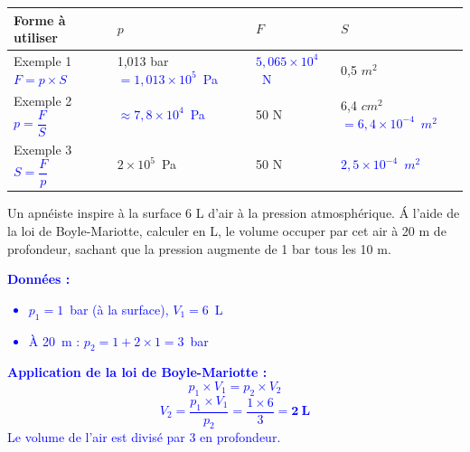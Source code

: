 \documentclass[11pt,a4paper]{article}
\renewcommand{\arraystretch}{2}
\newcommand{\correction}[1]{\textcolor{blue}{#1}}
\begin{document}
\begin{fleche}
\begin{center}
    \renewcommand{\arraystretch}{3}
    \begin{tabular}{|p{6cm}|C{2cm}|C{2cm}|C{2cm}|}
         \hline
      Forme à utiliser & $p$ & $F$ & $S$ \\
         \hline 
         Exemple 1 \newline \correction{$F = p \times S$} &  1,013 bar \newline \correction{$= 1{,}013 \times 10^5$~Pa} & \correction{$5{,}065 \times 10^4$~N} & 0,5 $m^2$\\
         \hline
         Exemple 2 \newline \correction{$p = \dfrac{F}{S}$} & \correction{$\approx 7{,}8 \times 10^4$~Pa} & 50 N & 6,4 $cm^2$ \newline \correction{$= 6{,}4\times 10^{-4}$~$m^2$}\\
         \hline 
         Exemple 3 \newline \correction{$S = \dfrac{F}{p}$} & $2 \times 10^5$~Pa & 50 N & \correction{$2{,}5 \times 10^{-4}$~$m^2$}\\
         \hline
    \end{tabular}
\end{center}

\vfill 


\vspace{-3mm}

\noindent%
\begin{minipage}{.36\textwidth}%
Un apnéiste inspire à la surface 6 L d'air à la pression atmosphérique. \'A l'aide de la loi de Boyle-Mariotte, calculer en L, le volume occuper par cet air à 20 m de profondeur, sachant que la pression augmente de 1 bar tous les 10 m.  
\end{minipage}%
\hfill
\begin{minipage}{.57\textwidth}%
\correction{
\textbf{Données :}
\begin{itemize}
    \item $p_1 = 1$~bar (à la surface), \quad $V_1 = 6$~L
    \item À 20~m : $p_2 = 1 + 2 \times 1 = 3$~bar
\end{itemize}
\textbf{Application de la loi de Boyle-Mariotte :}
$$p_1 \times V_1 = p_2 \times V_2$$
$$V_2 = \frac{p_1 \times V_1}{p_2} = \frac{1 \times 6}{3} = \mathbf{2~L}$$
Le volume de l'air est divisé par 3 en profondeur.
}
\end{minipage}%


\end{fleche}
\end{document}
